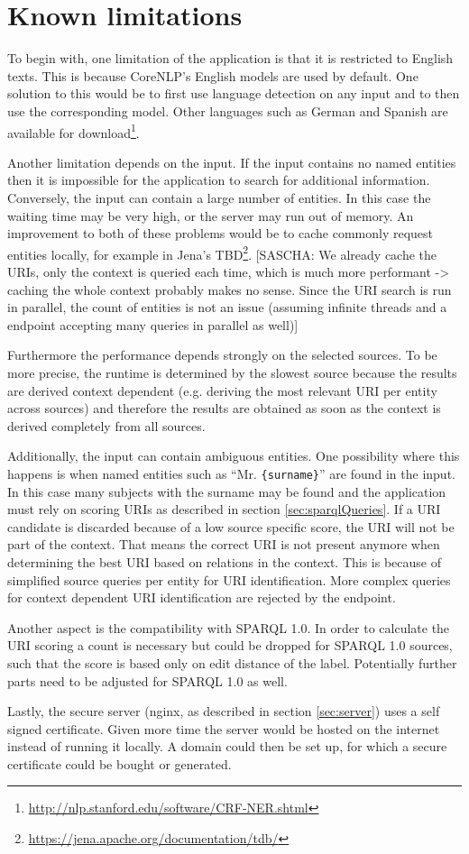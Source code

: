 \section{Known limitations}
\label{sec:Limits}
To begin with, one limitation of the application is that it is restricted to English texts. This is because CoreNLP's English models are used by default. One solution to this would be to first use language detection on any input and to then use the corresponding model. Other languages such as German and Spanish are available for download\footnote{\url{http://nlp.stanford.edu/software/CRF-NER.shtml}}. 

Another limitation depends on the input. If the input contains no named entities then it is impossible for the application to search for additional information. Conversely, the input can contain a large number of entities. In this case the waiting time may be very high, or the server may run out of memory. An improvement to both of these problems would be to cache commonly request entities locally, for example in Jena's TBD\footnote{\url{https://jena.apache.org/documentation/tdb/}}. [SASCHA: We already cache the URIs, only the context is queried each time, which is much more performant -> caching the whole context probably makes no sense. Since the URI search is run in parallel, the count of entities is not an issue (assuming infinite threads and a endpoint accepting many queries in parallel as well)]  

Furthermore the performance depends strongly on the selected sources. To be more precise, the runtime is determined by the slowest source because the results are derived context dependent (e.g. deriving the most relevant URI per entity across sources) and therefore the results are obtained as soon as the context is derived completely from all sources. 

Additionally, the input can contain ambiguous entities. One possibility where this happens is when named entities such as ``Mr. \texttt{\{surname\}}'' are found in the input. In this case many subjects with the surname may be found and the application must rely on scoring URIs as described in section \ref{sec:sparqlQueries}. If a URI candidate is discarded because of a low source specific score, the URI will not be part of the context. That means the correct URI is not present anymore when determining the best URI based on relations in the context. This is because of simplified source queries per entity for URI identification. More complex queries for context dependent URI identification are rejected by the endpoint.

Another aspect is the compatibility with SPARQL 1.0. In order to calculate the URI scoring a count is necessary but could be dropped for SPARQL 1.0 sources, such that the score is based only on edit distance of the label. Potentially further parts need to be adjusted for SPARQL 1.0 as well. 

Lastly, the secure server (nginx, as described in section \ref{sec:server}) uses a self signed certificate. Given more time the server would be hosted on the internet instead of running it locally. A domain could then be set up, for which a secure certificate could be bought or generated. 




